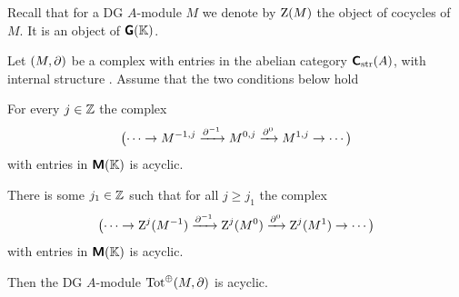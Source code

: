 Recall that for a DG $A$-module $M$ we denote by $\operatorname{Z}(M)$
the object of cocycles of $M$. It is an object of 
$\boldsymbol{\mathsf{G}}(\mathbb{K})$.

\begin{prop} \label{prop:3300}
Let $(M, \partial)$ be a complex with entries in the abelian category 
$\boldsymbol{\mathsf{C}}_{\mathrm{str}}(A)$, 
with internal structure \tup{(\ref{eqn:3305})}. Assume that the two conditions 
below hold\tup{:}
\begin{itemize}
 For every $j \in \mathbb{Z}$ the complex  
\[ \bigl( \cdots \to M^{-1, j} \xrightarrow{\partial^{-1}}
M^{0, j} \xrightarrow{\partial^{0}} M^{1, j} \to \cdots \bigr) \]
with entries in $\boldsymbol{\mathsf{M}}(\mathbb{K})$ is acyclic. 

 There is some $j_1 \in \mathbb{Z}$ such that for all 
$j \geq j_1$ the complex 
\[ \bigl( \cdots \to \operatorname{Z}^j(M^{-1}) \xrightarrow{\partial^{-1}}
\operatorname{Z}^j(M^{0}) \xrightarrow{\partial^{0}} \operatorname{Z}^j(M^{1}) \to \cdots \bigr) \]
with entries in $\boldsymbol{\mathsf{M}}(\mathbb{K})$ is acyclic. 
\end{itemize}
Then the DG $A$-module $\operatorname{Tot}^{\oplus}(M, \partial)$ is acyclic. 
\end{prop}

